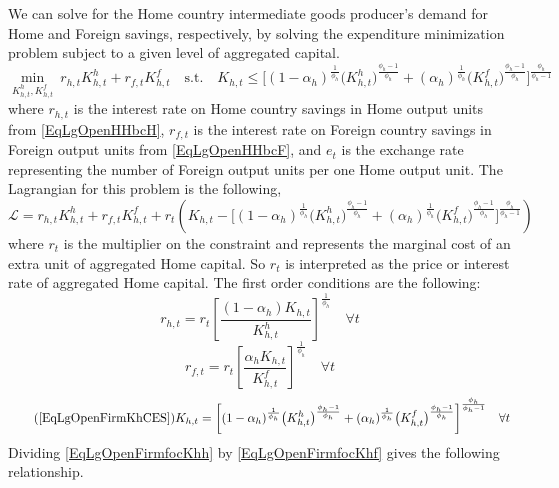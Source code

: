 \documentclass[letterpaper,12pt]{article}
\theoremstyle{definition}
\begin{document}
    We can solve for the Home country intermediate goods producer's demand for Home and Foreign savings, respectively, by solving the expenditure minimization problem subject to a given level of aggregated capital.
    \begin{equation}\label{EqLgOpenFirmMinProbH}
      \min_{K^h_{h,t},K^f_{h,t}} \: r_{h,t} K^h_{h,t} + r_{f,t}K^f_{h,t} \quad \text{s.t.} \quad K_{h,t} \leq \biggl[(1 - \alpha_h)^\frac{1}{\phi_h}\bigl(K^h_{h,t}\bigr)^\frac{\phi_h-1}{\phi_h} + (\alpha_h)^\frac{1}{\phi_h}\bigl(K^f_{h,t}\bigr)^\frac{\phi_h-1}{\phi_h}\biggr]^\frac{\phi_h}{\phi_h-1}
    \end{equation}
    where $r_{h,t}$ is the interest rate on Home country savings in Home output units from \eqref{EqLgOpenHHbcH}, $r_{f,t}$ is the interest rate on Foreign country savings in Foreign output units from \eqref{EqLgOpenHHbcF}, and $e_t$ is the exchange rate representing the number of Foreign output units per one Home output unit. The Lagrangian for this problem is the following,
    \begin{equation}\label{EqLgOpenFirmlagrH}
      \mathcal{L} = r_{h,t}K^h_{h,t} + r_{f,t}K^f_{h,t} + r_t\left(K_{h,t} - \biggl[(1 - \alpha_h)^\frac{1}{\phi_h}\bigl(K^h_{h,t}\bigr)^\frac{\phi_h-1}{\phi_h} + (\alpha_h)^\frac{1}{\phi_h}\bigl(K^f_{h,t}\bigr)^\frac{\phi_h-1}{\phi_h}\biggr]^\frac{\phi_h}{\phi_h-1}\right)
    \end{equation}
    where $r_t$ is the multiplier on the constraint and represents the marginal cost of an extra unit of aggregated Home capital. So $r_t$ is interpreted as the price or interest rate of aggregated Home capital. The first order conditions are the following:
    \begin{equation}\label{EqLgOpenFirmfocKhh}
      r_{h,t} = r_t\left[\frac{(1-\alpha_h)K_{h,t}}{K^h_{h,t}}\right]^{\frac{1}{\phi_h}} \quad\forall t
    \end{equation}
    \begin{equation}\label{EqLgOpenFirmfocKhf}
      r_{f,t} = r_t\left[\frac{\alpha_h K_{h,t}}{K^f_{h,t}}\right]^{\frac{1}{\phi_h}} \quad\forall t
    \end{equation}
    \begin{equation}\tag{\ref{EqLgOpenFirmKhCES}}
      K_{h,t}= \biggl[(1 - \alpha_h)^\frac{1}{\phi_h}\bigl(K^h_{h,t}\bigr)^\frac{\phi_h-1}{\phi_h} + (\alpha_h)^\frac{1}{\phi_h}\bigl(K^f_{h,t}\bigr)^\frac{\phi_h-1}{\phi_h}\biggr]^\frac{\phi_h}{\phi_h-1} \quad\forall t
    \end{equation}
    Dividing \eqref{EqLgOpenFirmfocKhh} by \eqref{EqLgOpenFirmfocKhf} gives the following relationship.
\end{document}
